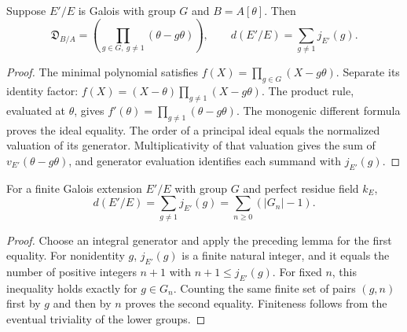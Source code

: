 \begin{lemma}
\label{fw:different-conjugate-product}
\leanok
Suppose $E'/E$ is Galois with group $G$ and $B=A[\theta]$. Then
\[
 \mathfrak D_{B/A}
 =\left(\prod_{g\in G,\ g\ne1}(\theta-g\theta)\right),\qquad
 d(E'/E)=\sum_{g\ne1}j_{E'}(g).
\]
\end{lemma}
\begin{proof}
The minimal polynomial satisfies
$f(X)=\prod_{g\in G}(X-g\theta)$. Separate its identity factor:
$f(X)=(X-\theta)\prod_{g\ne1}(X-g\theta)$.
The product rule, evaluated at $\theta$, gives
$f'(\theta)=\prod_{g\ne1}(\theta-g\theta)$.
The monogenic different formula proves the ideal equality.
The order of a principal ideal equals the normalized valuation of
its generator. Multiplicativity of that valuation gives the sum
of $v_{E'}(\theta-g\theta)$, and generator evaluation identifies
each summand with $j_{E'}(g)$.
\end{proof}

\begin{theorem}
\label{fw:hilbert-different}
\leanok
For a finite Galois extension $E'/E$ with group $G$ and perfect residue
field $k_E$,
\[
 d(E'/E)=\sum_{g\ne1}j_{E'}(g)
         =\sum_{n\geq0}(|G_n|-1).
\]
\end{theorem}
\begin{proof}
Choose an integral generator and apply the preceding lemma for the
first equality. For nonidentity $g$, $j_{E'}(g)$ is a finite natural
integer, and it equals the number of positive integers $n+1$ with
$n+1\leq j_{E'}(g)$. For fixed $n$, this inequality holds exactly
for $g\in G_n$. Counting the same finite set of pairs $(g,n)$ first
by $g$ and then by $n$ proves the second equality. Finiteness follows
from the eventual triviality of the lower groups.
\end{proof}

